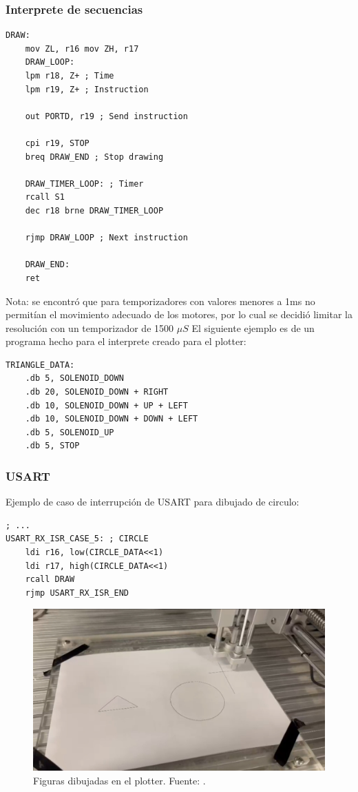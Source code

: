 \subsubsection{Interprete de secuencias}
\begin{verbatim}
DRAW:
    mov ZL, r16 mov ZH, r17
    DRAW_LOOP:
    lpm r18, Z+ ; Time
    lpm r19, Z+ ; Instruction

    out PORTD, r19 ; Send instruction

    cpi r19, STOP
    breq DRAW_END ; Stop drawing

    DRAW_TIMER_LOOP: ; Timer
    rcall S1
    dec r18 brne DRAW_TIMER_LOOP 

    rjmp DRAW_LOOP ; Next instruction

    DRAW_END:
    ret
\end{verbatim}
Nota: se encontró que para temporizadores con valores menores a 1ms no permitían el movimiento adecuado de los motores, por lo cual se decidió limitar la resolución con un temporizador de 1500 $\mu S$
El siguiente ejemplo es de un programa hecho para el interprete creado para el plotter:
\begin{verbatim}
TRIANGLE_DATA:
    .db 5, SOLENOID_DOWN	
    .db 20, SOLENOID_DOWN + RIGHT			
    .db 10, SOLENOID_DOWN + UP + LEFT		
    .db 10, SOLENOID_DOWN + DOWN + LEFT
    .db 5, SOLENOID_UP		
    .db 5, STOP
\end{verbatim}

\subsubsection{USART}
Ejemplo de caso de interrupción de USART para dibujado de circulo:
\begin{verbatim}
; ...
USART_RX_ISR_CASE_5: ; CIRCLE
    ldi r16, low(CIRCLE_DATA<<1) 
    ldi r17, high(CIRCLE_DATA<<1)
    rcall DRAW
    rjmp USART_RX_ISR_END
\end{verbatim}

\begin{figure}[H]
  \centering
  \includegraphics[width=\linewidth]{./Anexos/Resultados/Plotter/Dibujos.jpg}
  \caption{Figuras dibujadas en el plotter. Fuente: \cite{LabDrive}.}
  \label{fig:plotter_figuras}
\end{figure}